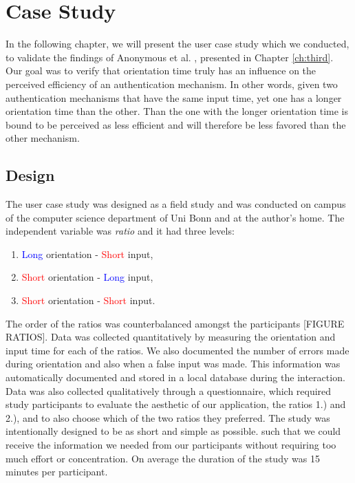 
\chapter{Case Study}\label{ch:fifth}

In the following chapter, we will present the user case study which we conducted, to validate the findings of Anonymous et al. \cite{anonymous}, presented in Chapter \ref{ch:third}. Our goal was to verify that orientation time truly has an influence on the perceived efficiency of an authentication mechanism. In other words, given two authentication mechanisms that have the same input time, yet one has a longer orientation time than the other. Than the one with the longer orientation time is bound to be perceived as less efficient and will therefore be less favored than the other mechanism. 

\section{Design}

The user case study was designed as a field study and was conducted on campus of the computer science department of Uni Bonn and at the author's home. The independent variable was \textit{ratio} and it had three levels:
\begin{enumerate}
    \item \textcolor{blue}{Long} orientation - \textcolor{red}{Short} input, 
    \item \textcolor{red}{Short} orientation - \textcolor{blue}{Long} input,
    \item \textcolor{red}{Short} orientation - \textcolor{red}{Short} input.
\end{enumerate}

The order of the ratios was counterbalanced amongst the participants [FIGURE RATIOS]. Data was collected quantitatively by measuring the orientation and input time for each of the ratios. We also documented the number of errors made during orientation and also when a false input was made. This information was automatically documented and stored in a local database during the interaction. Data was also collected qualitatively through a questionnaire, which required study participants to evaluate the aesthetic of our application, the ratios 1.) and 2.), and to also choose which of the two ratios they preferred. The study was intentionally designed to be as short and simple as possible. such that we could receive the information we needed from our participants without requiring too much effort or concentration. On average the duration of the study was 15 minutes per participant. 

